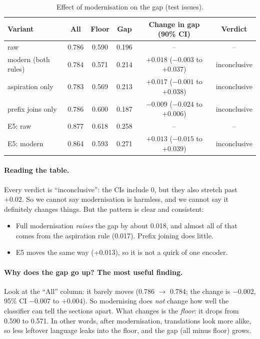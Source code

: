 \documentclass[11pt,a4paper]{article}
\begin{document}
\begin{table}[h]
\centering
\begin{tabular}{@{}lccccc@{}}
\toprule
Variant & All & Floor & Gap & Change in gap (90\% CI) & Verdict \\
\midrule
raw & 0.786 & 0.590 & 0.196 & -- & -- \\
modern (both rules) & 0.784 & 0.571 & 0.214 & $+0.018$ ($-0.003$ to $+0.037$) & inconclusive \\
aspiration only & 0.783 & 0.569 & 0.213 & $+0.017$ ($-0.001$ to $+0.038$) & inconclusive \\
prefix joins only & 0.786 & 0.600 & 0.187 & $-0.009$ ($-0.024$ to $+0.006$) & inconclusive \\
\midrule
E5: raw & 0.877 & 0.618 & 0.258 & -- & -- \\
E5: modern & 0.864 & 0.593 & 0.271 & $+0.013$ ($-0.015$ to $+0.039$) & inconclusive \\
\bottomrule
\end{tabular}
\caption{Effect of modernisation on the gap (test issues).}
\label{tab:h2}
\end{table}

\paragraph{Reading the table.} Every verdict is ``inconclusive'': the CIs include 0, but they also
stretch past $+0.02$. So we cannot say modernisation is harmless, and we cannot say it definitely
changes things. But the pattern is clear and consistent:
\begin{itemize}
  \item Full modernisation \emph{raises} the gap by about 0.018, and almost all of that comes from the
  aspiration rule (0.017). Prefix joining does little.
  \item E5 moves the same way (+0.013), so it is not a quirk of one encoder.
\end{itemize}

\paragraph{Why does the gap go up? The most useful finding.} Look at the ``All'' column: it barely moves
(0.786 $\to$ 0.784; the change is $-0.002$, 95\% CI $-0.007$ to $+0.004$). So modernising does
\emph{not} change how well the classifier can tell the sections apart. What changes is the
\emph{floor}: it drops from 0.590 to 0.571. In other words, after modernisation, translations look
more alike, so less leftover language leaks into the floor, and the gap (all minus floor) grows.
\end{document}
